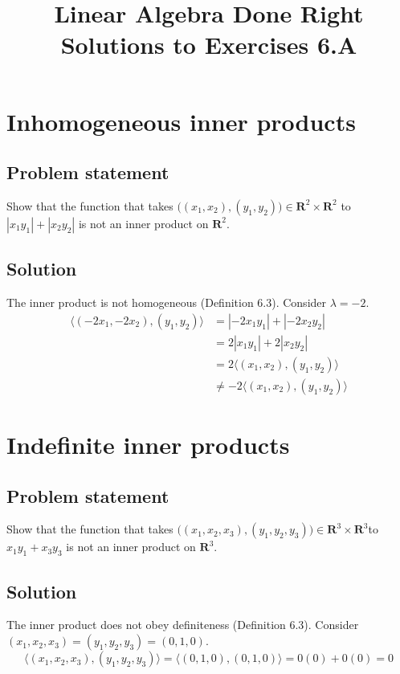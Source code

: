\documentclass{article}
\title{Linear Algebra Done Right\\Solutions to Exercises 6.A}
\author{}
\date{}
\begin{document}
\maketitle

\section{Inhomogeneous inner products}
\subsection*{Problem statement}
Show that the function that takes $\big((x_1,x_2),(y_1,y_2)\big)\in \mathbf{R}^2\times\mathbf{R}^2$ to $|x_1y_1|+|x_2y_2|$ is not an inner product on $\mathbf{R}^2$.

\subsection*{Solution}
The inner product is not homogeneous (Definition 6.3). 
Consider $\lambda=-2$. 
\begin{align*} 
\langle(-2x_1,-2x_2),(y_1,y_2)\rangle &= |-2x_1y_1|+|-2x_2y_2| \\ 
 &= 2|x_1y_1| + 2|x_2y_2|\\
 &= 2\langle(x_1,x_2),(y_1,y_2)\rangle\\
 &\neq -2\langle(x_1,x_2),(y_1,y_2)\rangle
\end{align*}

\clearpage

\section{Indefinite inner products}
\subsection*{Problem statement}
Show that the function that takes $\big((x_1,x_2,x_3),(y_1,y_2,y_3)\big)\in \mathbf{R}^3\times\mathbf{R}^3$\newline to $x_1y_1+x_3y_3$ is not an inner product on $\mathbf{R}^3$.

\subsection*{Solution}
The inner product does not obey definiteness (Definition 6.3). 
Consider\newline $(x_1,x_2,x_3)=(y_1,y_2,y_3)=(0,1,0)$.
\[\langle(x_1,x_2,x_3),(y_1,y_2,y_3)\rangle=\langle(0,1,0),(0,1,0)\rangle=0(0)+0(0)=0\]
\end{document}
